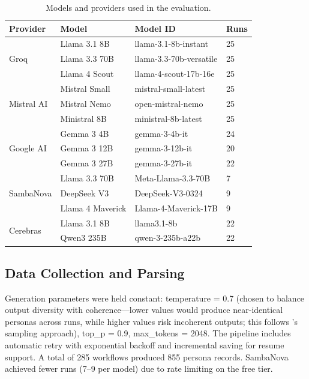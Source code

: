 \documentclass[12pt,a4paper]{article}
\begin{document}
\begin{table}[H]
\centering
\caption{Models and providers used in the evaluation.}
\label{tab:models}
\small
\begin{tabular}{llll}
\toprule
\textbf{Provider} & \textbf{Model} & \textbf{Model ID} & \textbf{Runs} \\
\midrule
\multirow{3}{*}{Groq} & Llama 3.1 8B & llama-3.1-8b-instant & 25 \\
 & Llama 3.3 70B & llama-3.3-70b-versatile & 25 \\
 & Llama 4 Scout & llama-4-scout-17b-16e & 25 \\
\midrule
\multirow{3}{*}{Mistral AI} & Mistral Small & mistral-small-latest & 25 \\
 & Mistral Nemo & open-mistral-nemo & 25 \\
 & Ministral 8B & ministral-8b-latest & 25 \\
\midrule
\multirow{3}{*}{Google AI} & Gemma 3 4B & gemma-3-4b-it & 24 \\
 & Gemma 3 12B & gemma-3-12b-it & 20 \\
 & Gemma 3 27B & gemma-3-27b-it & 22 \\
\midrule
\multirow{3}{*}{SambaNova} & Llama 3.3 70B & Meta-Llama-3.3-70B & 7 \\
 & DeepSeek V3 & DeepSeek-V3-0324 & 9 \\
 & Llama 4 Maverick & Llama-4-Maverick-17B & 9 \\
\midrule
\multirow{2}{*}{Cerebras} & Llama 3.1 8B & llama3.1-8b & 22 \\
 & Qwen3 235B & qwen-3-235b-a22b & 22 \\
\bottomrule
\end{tabular}
\end{table}

\subsection{Data Collection and Parsing}

Generation parameters were held constant: temperature = 0.7 (chosen to balance output diversity with coherence---lower values would produce near-identical personas across runs, while higher values risk incoherent outputs; this follows \cite{wang2023decodingtrust}'s sampling approach), top\_p = 0.9, max\_tokens = 2048. The pipeline includes automatic retry with exponential backoff and incremental saving for resume support. A total of 285 workflows produced 855 persona records. SambaNova achieved fewer runs (7--9 per model) due to rate limiting on the free tier.
\end{document}
